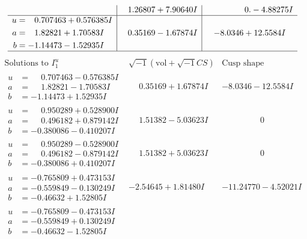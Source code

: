 \documentclass[1p]{elsarticle_modified}
\theoremstyle{definition}
\newcommand{\I}{\sqrt{-1}}
\begin{document}
$$\begin{array}{c|c|c}
 & \phantom{-}1.26807 + 7.90640 I & \phantom{-0.000000 } 0. - 4.88275 I \\ \hline\begin{aligned}
u &= \phantom{-}0.707463 + 0.576385 I \\
a &= \phantom{-}1.82821 + 1.70583 I \\
b &= -1.14473 - 1.52935 I\end{aligned}
 & \phantom{-}0.35169 - 1.67874 I & -8.0346 + 12.5584 I\\
 \hline 
 \end{array}$$\newpage$$\begin{array}{c|c|c}  
\text{Solutions to }I^u_{1}& \I (\text{vol} + \sqrt{-1}CS) & \text{Cusp shape}\\
 \hline 
\begin{aligned}
u &= \phantom{-}0.707463 - 0.576385 I \\
a &= \phantom{-}1.82821 - 1.70583 I \\
b &= -1.14473 + 1.52935 I\end{aligned}
 & \phantom{-}0.35169 + 1.67874 I & -8.0346 - 12.5584 I \\ \hline\begin{aligned}
u &= \phantom{-}0.950289 + 0.528900 I \\
a &= \phantom{-}0.496182 + 0.879142 I \\
b &= -0.380086 - 0.410207 I\end{aligned}
 & \phantom{-}1.51382 - 5.03623 I & \phantom{-0.000000 } 0 \\ \hline\begin{aligned}
u &= \phantom{-}0.950289 - 0.528900 I \\
a &= \phantom{-}0.496182 - 0.879142 I \\
b &= -0.380086 + 0.410207 I\end{aligned}
 & \phantom{-}1.51382 + 5.03623 I & \phantom{-0.000000 } 0 \\ \hline\begin{aligned}
u &= -0.765809 + 0.473153 I \\
a &= -0.559849 - 0.130249 I \\
b &= -0.46632 + 1.52805 I\end{aligned}
 & -2.54645 + 1.81480 I & -11.24770 - 4.52021 I \\ \hline\begin{aligned}
u &= -0.765809 - 0.473153 I \\
a &= -0.559849 + 0.130249 I \\
b &= -0.46632 - 1.52805 I\end{aligned}

\end{array}$$
\end{document}
